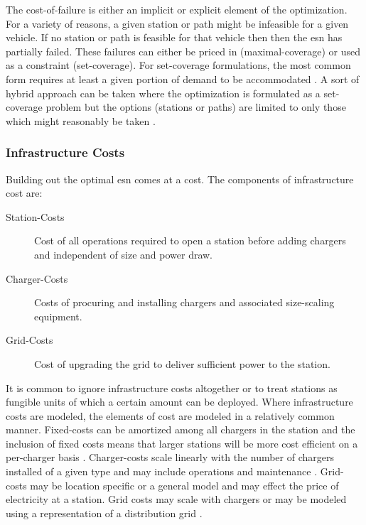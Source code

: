 The cost-of-failure is either an implicit or explicit element of the optimization. For a variety of reasons, a given station or path might be infeasible for a given vehicle. If no station or path is feasible for that vehicle then then the \gls{esn} has partially failed. These failures can either be priced in (maximal-coverage) or used as a constraint (set-coverage). For set-coverage formulations, the most common form requires at least a given portion of demand to be accommodated \citep{Ala_2024_scis, Anjos_2020_ejor, Arslan_2019_ts, Davatgari_2024_ejor, Pourvaziri_2024_tre, Tian_2018_s, Wu_2024_trd, Vijay_2024_es, Xiao_2020_jes, Yi_2019_e, Zhang_2023_ijpr, Zhu_2018_jssse}. A sort of hybrid approach can be taken where the optimization is formulated as a set-coverage problem but the options (stations or paths) are limited to only those which might reasonably be taken \citep{Faustino_2023_e, Gupta_2023_jes, Huang_Li_2015_nse, Kim_2012_ijhe, Kuby_2005_seps, Kuby_2007_nse, Kuby_2023_he, Li_Huang_2016_trc, Ma_Xie_2021_trd, MirHassani_2013_ts, Tungom_2024_esa, Upchurch_2009_ga, Zhang_2017_trb}.

\subsubsection{Infrastructure Costs}

Building out the optimal \gls{esn} comes at a cost. The components of infrastructure cost are:

\begin{description}
	\item[Station-Costs] Cost of all operations required to open a station before adding chargers and independent of size and power draw.
	\item[Charger-Costs] Costs of procuring and installing chargers and associated size-scaling equipment.
	\item[Grid-Costs] Cost of upgrading the grid to deliver sufficient power to the station.
\end{description}

It is common to ignore infrastructure costs altogether or to treat stations as fungible units of which a certain amount can be deployed. Where infrastructure costs are modeled, the elements of cost are modeled in a relatively common manner. Fixed-costs can be amortized among all chargers in the station and the inclusion of fixed costs means that larger stations will be more cost efficient on a per-charger basis \citep{Ala_2024_scis, Anjos_2020_ejor, Pourvaziri_2024_tre, Vijay_2024_es, Wang_2022_er, Wu_2024_trd, Xiao_2020_jes, Zhang_2023_ijpr, Zhu_2018_jssse}. Charger-costs scale linearly with the number of chargers installed \citep{Ala_2024_scis, Anjos_2020_ejor, Davatgari_2024_ejor, Gupta_2023_jes, Pourvaziri_2024_tre, Vijay_2024_es, Wang_2022_er, Wu_2024_trd, Xiao_2020_jes, Zhang_2023_ijpr, Zhu_2018_jssse} of a given type and may include operations and maintenance \citep{Yi_2019_e, Zhu_2018_jssse}. Grid-costs may be location specific or a general model and may effect the price of electricity at a station. Grid costs may scale with chargers \cite{Yi_2019_e} or may be modeled using a representation of a distribution grid \cite{Gupta_2023_jes, Vijay_2024_es}.

